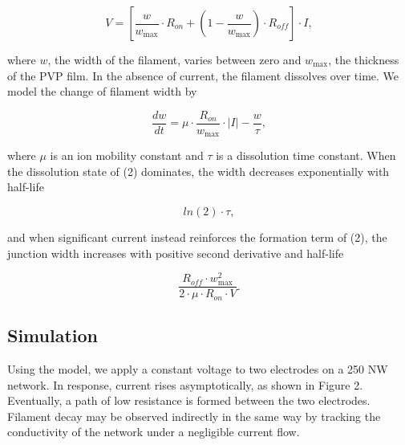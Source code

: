 \documentclass[twocolumn]{article}
\begin{document}
\begin{equation} V = \left[ \frac{w}{w_{\max}} \cdot R_{on} + \left(1-\frac{w}{w_{\max}}\right) \cdot R_{off} \right] \cdot I, \end{equation}

where $w$, the width of the filament, varies between zero and $w_{\max}$, the thickness of the PVP film. In the absence of current, the filament dissolves over time. We model the change of filament width by

\begin{equation} \frac{dw}{dt} = \mu \cdot \frac{R_{on}}{w_{\max}} \cdot |I| - \frac{w}{\tau}, \end{equation}

where $\mu$ is an ion mobility constant and $\tau$ is a dissolution time constant. When the dissolution state of (2) dominates, the width decreases exponentially with half-life 

\begin{equation} ln(2)\cdot\tau, \end{equation}

and when significant current instead reinforces the formation term of (2), the junction width increases with positive second derivative and half-life

\begin{equation} \frac{R_{off}\cdot w_{\max}^2}{2\cdot\mu\cdot R_{on}\cdot V}.\end{equation}

\subsection{Simulation}

Using the model, we apply a constant voltage to two electrodes on a 250 NW network. In response, current rises asymptotically, as shown in Figure 2. Eventually, a path of low resistance is formed between the two electrodes. Filament decay may be observed indirectly in the same way by tracking the conductivity of the network under a negligible current flow.
\end{document}
